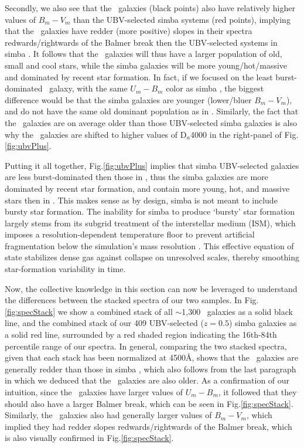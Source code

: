 \documentclass[twocolumn, linenumbers]{aastex631}
\renewcommand{\fig}{Fig.\hspace{.2em}}
\newcommand{\simba}[0]{{\sc simba} }
\begin{document}
Secondly, we also see that the \squig\ galaxies (black points) also have relatively higher values of $B_m-V_m$ than the UBV-selected \simba systems (red points), implying that the \squig\ galaxies have redder (more positive) slopes in their spectra redwards/rightwards of the Balmer break then the UBV-selected systems in \simba.  It follows that the \squig\ galaxies will thus have a larger population of old, small and cool stars, while the \simba galaxies will be more young/hot/massive and dominated by recent star formation.  In fact, if we focused on the least burst-dominated \squig\ galaxy, with the same $U_m-B_m$ color as \simba, the biggest difference would be that the \simba galaxies are younger (lower/bluer $B_m-V_m$), and do not have the same old dominant population as in \squig.  Similarly, the fact that the \squig\ galaxies are on average older than those UBV-selected \simba galaxies is also why the \squig\ galaxies are shifted to higher values of D$_n$4000 in the right-panel of \fig\ref{fig:ubvPlus}.



Putting it all together, \fig\ref{fig:ubvPlus} implies that \simba UBV-selected galaxies are less burst-dominated then those in \squig, thus the \simba galaxies are more dominated by recent star formation, and contain more young, hot, and massive stars then in \squig.  This makes sense as by design, \simba is not meant to include bursty star formation.  The inability for \simba to produce `bursty' star formation largely stems from its subgrid treatment of the interstellar medium (ISM), which imposes a resolution-dependent temperature floor to prevent artificial fragmentation below the simulation’s mass resolution \citep{Springel03, mufasa, simba}. This effective equation of state stabilizes dense gas against collapse on unresolved scales, thereby smoothing star-formation variability in time.  

Now, the collective knowledge in this section can now be leveraged to understand the differences between the stacked spectra of our two samples.  In \fig\ref{fig:specStack} we show a combined stack of all $\sim$1,300 \squig\ galaxies as a solid black line, and the combined stack of our 409 UBV-selected ($z=0.5$) \simba galaxies as a solid red line, surrounded by a red shaded region indicating the 16th-84th percentile range of our spectra.  In general, comparing the two stacked spectra, given that each stack has been normalized at 4500\r{A}, shows that the \squig\ galaxies are generally redder than those in \simba\!\!, which also follows from the last paragraph in which we deduced that the \squig\ galaxies are also older.  As a confirmation of our intuition, since the \squig\ galaxies have larger values of $U_m-B_m$, it followed that they should also have a larger Balmer break, which can be seen in \fig\ref{fig:specStack}.  Similarly, the \squig\ galaxies also had generally larger values of $B_m-V_m$, which implied they had redder slopes redwards/rightwards of the Balmer break, which is also visually confirmed in \fig\ref{fig:specStack}.
\end{document}
